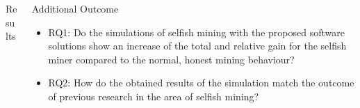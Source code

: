 \documentclass[final,hyperref={pdfpagelabels=true}]{beamer}
\begin{document}
\begin{frame}
\begin{columns}[t]
\begin{column}{.55\textwidth}
\begin{block}{Results}
      \end{block}  
                
    \end{column}

    \begin{column}{.35\textwidth}
    
      \begin{block}{Additional Outcome}
      	\begin{itemize}
     		\item RQ1: Do the simulations of selfish mining with the proposed software solutions
show an increase of the total and relative gain for the selfish miner compared to
the normal, honest mining behaviour?
			\item RQ2: How do the obtained results of the simulation match the outcome of previous
research in the area of selfish mining?
      	\end{itemize}
      \end{block}

    \end{column}

  \end{columns}

\end{frame}
\end{document}

